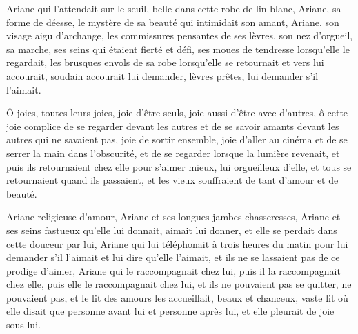 
	{

Ariane qui l'attendait sur le seuil, belle dans cette robe de lin blanc, Ariane, sa forme de déesse, le mystère de sa beauté qui intimidait son amant, Ariane, son visage aigu d'archange, les commissures pensantes de ses lèvres, son nez d'orgueil, sa marche, ses seins qui étaient fierté et défi, ses moues de tendresse lorsqu'elle le regardait, les brusques envols de sa robe lorsqu'elle se retournait et vers lui accourait, soudain accourait lui demander, lèvres prêtes, lui demander s'il l'aimait.

Ô joies, toutes leurs joies, joie d'être seuls, joie aussi d'être avec d'autres, ô cette joie complice de se regarder devant les autres et de se savoir amants devant les autres qui ne savaient pas, joie de sortir ensemble, joie d'aller au cinéma et de se serrer la main dans l'obscurité, et de se regarder lorsque la lumière revenait, et puis ils retournaient chez elle pour s'aimer mieux, lui orgueilleux d'elle, et tous se retournaient quand ils passaient, et les vieux souffraient de tant d'amour et de beauté.

Ariane religieuse d'amour, Ariane et ses longues jambes chasseresses, Ariane et ses seins fastueux qu'elle lui donnait, aimait lui donner, et elle se perdait dans cette douceur par lui, Ariane qui lui téléphonait à trois heures du matin pour lui demander s'il l'aimait et lui dire qu'elle l'aimait, et ils ne se lassaient pas de ce prodige d'aimer, Ariane qui le raccompagnait chez lui, puis il la raccompagnait chez elle, puis elle le raccompagnait chez lui, et ils ne pouvaient pas se quitter, ne pouvaient pas, et le lit des amours les accueillait, beaux et chanceux, vaste lit où elle disait que personne avant lui et personne après lui, et elle pleurait de joie sous lui.
}

